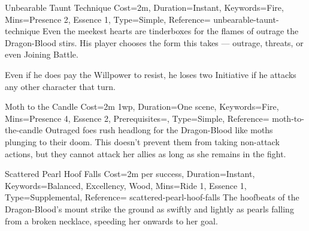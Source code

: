 
\begin{Charm}{Unbearable Taunt Technique}{%
    Cost=2m,
    Duration=Instant,
    Keywords=Fire,
    Mins={Presence 2, Essence 1},
    Type=Simple,
    Reference=\cite*[p.~242]{db}
}{unbearable-taunt-technique}
    Even the meekest hearts are tinderboxes for the flames of outrage the
    Dragon-Blood stirs.  His
    player chooses the form this takes --- outrage, threats, or even Joining
    Battle.

     Even if he does pay the Willpower to resist, he loses two
    Initiative if he attacks any other character that turn.
\end{Charm}


\DocumentColumnBreak
\begin{Charm}{Moth to the Candle}{%
    Cost=2m 1wp,
    Duration=One scene,
    Keywords=Fire,
    Mins={Presence 4, Essence 2},
    Prerequisites=,
    Type=Simple,
    Reference=\cite*[p.~243]{db}
}{moth-to-the-candle}
    Outraged foes rush headlong for the Dragon-Blood like moths plunging to their
    doom.  This doesn't
    prevent them from taking non-attack actions, but they cannot attack her allies
    as long as she remains in the fight. 

\end{Charm}




\begin{Charm}{Scattered Pearl Hoof Falls}{%
    Cost=2m per success,
    Duration=Instant,
    Keywords={Balanced, Excellency, Wood},
    Mins={Ride 1, Essence 1},
    Type=Supplemental,
    Reference=\cite*[p.~251]{db}
}{scattered-pearl-hoof-falls}
    The hoofbeats of the Dragon-Blood's mount strike the ground as swiftly and
    lightly as pearls falling from a broken necklace, speeding her onwards to her
    goal. 
\end{Charm}




